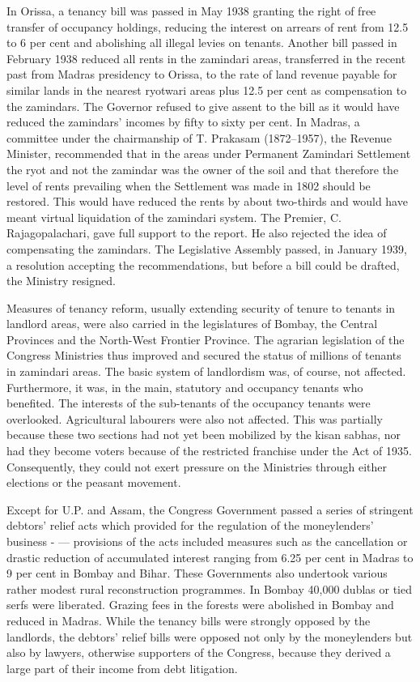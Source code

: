 In Orissa, a tenancy bill was passed in May 1938 granting the right of free transfer of occupancy holdings, reducing the interest on arrears of rent from 12.5 to 6 per cent and abolishing all illegal levies on tenants. Another bill passed in February 1938 reduced all rents in the zamindari areas, transferred in the recent past from Madras presidency to Orissa, to the rate of land revenue payable for similar lands in the nearest ryotwari areas plus 12.5 per cent as compensation to the zamindars. The Governor refused to give assent to the bill as it would have reduced the zamindars' incomes by fifty to sixty per cent. In Madras, a committee under the chairmanship of T. Prakasam (1872--1957), the Revenue Minister, recommended that in the areas under Permanent Zamindari Settlement the ryot and not the zamindar was the owner of the soil and that therefore the level of rents prevailing when the Settlement was made in 1802 should be restored. This would have reduced the rents by about two-thirds and would have meant virtual liquidation of the zamindari system. The Premier, C. Rajagopalachari, gave full support to the report. He also rejected the idea of compensating the zamindars. The Legislative Assembly passed, in January 1939, a resolution accepting the recommendations, but before a bill could be drafted, the Ministry resigned. 

Measures of tenancy reform, usually extending security of tenure to tenants in landlord areas, were also carried in the legislatures of Bombay, the Central Provinces and the North-West Frontier Province. The agrarian legislation of the Congress Ministries thus improved and secured the status of millions of tenants in zamindari areas. The basic system of landlordism was, of course, not affected. Furthermore, it was, in the main, statutory and occupancy tenants who benefited. The interests of the sub-tenants of the occupancy tenants were overlooked. Agricultural labourers were also not affected. This was partially because these two sections had not yet been mobilized by the kisan sabhas, nor had they become voters because of the restricted franchise under the Act of 1935. Consequently, they could not exert pressure on the Ministries through either elections or the peasant movement. 

Except for U.P. and Assam, the Congress Government passed a series of stringent debtors' relief acts which provided for the regulation of the moneylenders' business - --- provisions of the acts included measures such as the cancellation or drastic reduction of accumulated interest ranging from 6.25 per cent in Madras to 9 per cent in Bombay and Bihar. These Governments also undertook various rather modest rural reconstruction programmes. In Bombay 40,000 dublas or tied serfs were liberated. Grazing fees in the forests were abolished in Bombay and reduced in Madras. While the tenancy bills were strongly opposed by the landlords, the debtors' relief bills were opposed not only by the moneylenders but also by lawyers, otherwise supporters of the Congress, because they derived a large part of their income from debt litigation.

